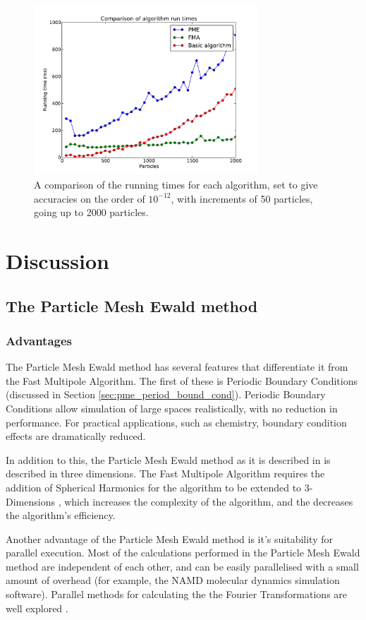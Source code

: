 \documentclass[pdftex,twoside,a4paper]{report}
\newcommand{\bcen}{\begin{center}}
\newcommand{\ecen}{\end{center}}
\newcommand{\pmem}{Particle Mesh Ewald method}
\newcommand{\fma}{Fast Multipole Algorithm}
\begin{document}
\begin{figure}[H]
\bcen \includegraphics[width=0.75\textwidth]{figures/graphs/comp_graph_low.pdf} \ecen
\caption{A comparison of the running times for each algorithm, set to give accuracies on the order of $10^{-12}$, with increments of 50 particles, going up to 2000 particles.}
\label{fig:comp_graph_low}
\end{figure}
\section{Discussion}
\subsection{The \pmem{}}
\subsubsection{Advantages}
The \pmem{} has several features that differentiate it from the \fma{}. The first of these is Periodic Boundary Conditions (discussed in Section \ref{sec:pme_period_bound_cond}). Periodic Boundary Conditions allow simulation of large spaces realistically, with no reduction in performance. For practical applications, such as chemistry, boundary condition effects are dramatically reduced.

In addition to this, the \pmem{} as it is described in \cite{darden:10089} is described in three dimensions. The \fma{} requires the addition of Spherical Harmonics for the algorithm to be extended to 3-Dimensions \cite{spherical}, which increases the complexity of the algorithm, and the decreases the algorithm's efficiency.

Another advantage of the \pmem{} is it's suitability for parallel execution. Most of the calculations performed in the \pmem{} are independent of each other, and can be easily parallelised with a small amount of overhead (for example, the NAMD \cite{NAMD} molecular dynamics simulation software). Parallel methods for calculating the the Fourier Transformations are well explored \cite{lee05}.
\end{document}
